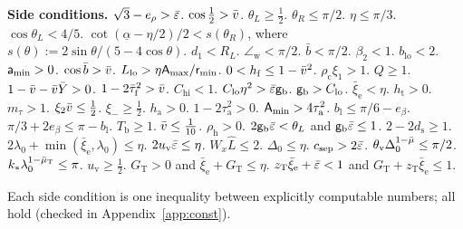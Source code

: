 \noindent\textbf{Side conditions.} {\small
{} $\sqrt3-e_\rho>\bar\varepsilon$.  $\cos\frac12>\bar v$.  $\theta_L\ge\frac12$.  $\theta_R\le\pi/2$.
 $\eta\le\pi/3$.  $\cos\theta_L<4/5$.  $\cot(\underline\alpha-\eta/2)/2<s(\theta_R)$, where
$s(\theta):=2\sin\theta/(5-4\cos\theta)$.  $d_1<R_L$.  $\angle_{\mathrm w}<\pi/2$.  $\bar b<\pi/2$.
 $\beta_2<1$.  $b_{\mathrm{lo}}<2$.  $\mathsf a_{\min}>0$.  $\cos\bar b>\bar v$.
 $L_{\mathrm{lo}}>\eta\mathsf A_{\max}/\mathsf r_{\min}$.  $0<h_{\mathrm f}\le1-\bar v^2$.  $\rho_{\mathrm c}\xi_1>1$.
 $Q\ge1$.  $1-\bar v-\bar v\bar Y>0$.  $1-2\bar\tau_{\mathrm f}^2>\bar v$.  $C_{\mathrm{hi}}<1$.
 $C_{\mathrm{lo}}\eta^2>\bar\varepsilon\mathsf g_{\mathrm b}$.  $\mathsf g_{\mathrm b}>C_{\mathrm{lo}}$.  $\bar\xi_{\mathrm e}<\eta$.
 $h_{\mathrm t}>0$.  $m_\tau>1$.  $\xi_2\bar v\le\frac12$.  $\xi_-\ge\frac12$.
 $h_{\mathrm a}>0$.  $1-2\tau_{\mathrm a}^2>0$.  $\mathsf A_{\min}>4\tau_{\mathrm a}^2$.
 $b_{\mathrm l}\le\pi/6-e_\beta$.  $\pi/3+2e_\beta\le\pi-b_{\mathrm l}$.  $T_{\mathrm b}\ge1$.
 $\bar v\le\frac1{10}$.  $\rho_{\mathrm h}>0$.  $2\mathsf g_{\mathrm b}\bar\varepsilon<\theta_L$ and $\mathsf g_{\mathrm b}\bar\varepsilon\le1$.
 $2-2d_{\mathrm s}\ge1$.  $2\lambda_0+\min(\bar\xi_{\mathrm e},\lambda_0)\le\eta$. 
$2u_{\mathrm v}\bar\varepsilon\le\eta$.  $W_x\hat L\le2$.  $\Delta_0\le\eta$.
 $c_{\mathrm{sep}}>2\bar\varepsilon$.  $\theta_{\mathrm v}\Delta_0^{1-\bar\mu}\le\pi/2$.
 $k_*\lambda_0^{1-\bar\mu_{\mathrm T}}\le\pi$.  $u_{\mathrm v}\ge\frac12$.
 $G_{\mathrm T}>0$ and $\bar\xi_{\mathrm e}+G_{\mathrm T}\le\eta$.  $z_{\mathrm T}\bar\xi_{\mathrm e}+\bar\varepsilon<1$ and
$G_{\mathrm T}+z_{\mathrm T}\bar\xi_{\mathrm e}\le1$.}

\medskip
Each side condition is one inequality between explicitly computable numbers; all hold (checked in Appendix~\ref{app:const}).


